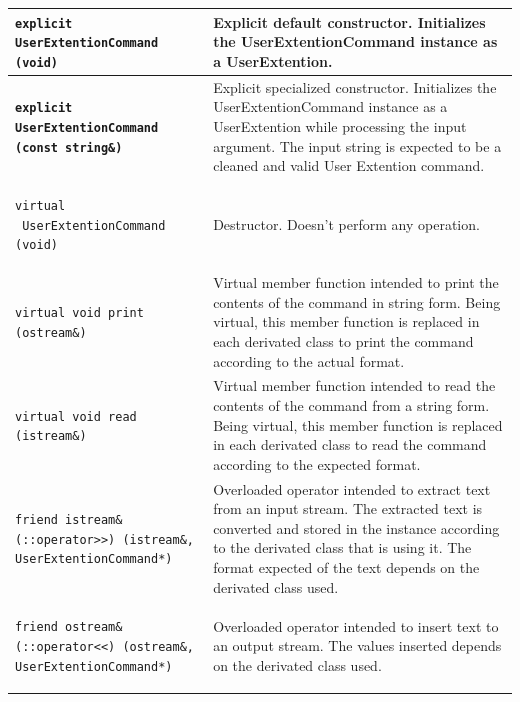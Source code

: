 \documentclass[11pt,twoside,openany,x11names,svgnames]{memoir}
\begin{document}
\begin{table}[h]\footnotesize
\centering
\begin{tabular}{| >{\bfseries}p{8.5cm} | p{7cm} |}
	\hline
	
	\texttt{explicit UserExtentionCommand (void)} & Explicit default constructor. Initializes the UserExtentionCommand instance as a UserExtention. \\
	
	\hline
	
	\texttt{explicit UserExtentionCommand (const string\&)} & Explicit specialized constructor. Initializes the UserExtentionCommand instance as a UserExtention while processing the input argument. The input string is expected to be a cleaned and valid User Extention command. \\
	
	\hline
	
	\texttt{virtual ~UserExtentionCommand (void)} & Destructor. Doesn't perform any operation. \\
	
	\hline
	
	\texttt{virtual void print (ostream\&)} & Virtual member function intended to print the contents of the command in string form. Being virtual, this member function is replaced in each derivated class to print the command according to the actual format. \\
	
	\hline
	
	\texttt{virtual void read (istream\&)} & Virtual member function intended to read the contents of the command from a string form. Being virtual, this member function is replaced in each derivated class to read the command according to the expected format. \\
	
	\hline	
		
	\texttt{friend istream\& (::operator>>) (istream\&, UserExtentionCommand*)} & Overloaded operator intended to extract text from an input stream. The extracted text is converted and stored in the instance according to the derivated class that is using it. The format expected of the text depends on the derivated class used. \\
	
	\hline
	
	\texttt{friend ostream\& (::operator<<) (ostream\&, UserExtentionCommand*)} & Overloaded operator intended to insert text to an output stream. The values inserted depends on the derivated class used. \\
	

\end{tabular}
\end{table}
\end{document}
